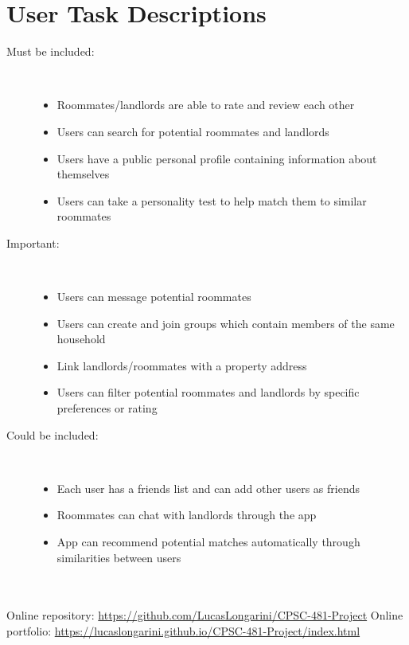 \documentclass{article}
\begin{document}
\section{User Task Descriptions}
\begin{description}
    \item[Must be included:]
        \newline \,
        \begin{itemize}
            \item Roommates/landlords are able to rate and review each other
            \item Users can search for potential roommates and landlords
            \item Users have a public personal profile containing information about themselves
            \item Users can take a personality test to help match them to similar roommates
        \end{itemize}
    \item[Important:]
        \newline \,
        \begin{itemize}
            \item Users can message potential roommates
            \item Users can create and join groups which contain members of the same household
            \item Link landlords/roommates with a property address
            \item Users can filter potential roommates and landlords by specific preferences or rating
        \end{itemize}
    \item[Could be included:]
        \newline \,
        \begin{itemize}
            \item Each user has a friends list and can add other users as friends
            \item Roommates can chat with landlords through the app
            \item App can recommend potential matches automatically through similarities between users
        \end{itemize}
\end{description}

\\~\\
Online repository: \url{https://github.com/LucasLongarini/CPSC-481-Project}
\newline
Online portfolio: \url{https://lucaslongarini.github.io/CPSC-481-Project/index.html}
\end{document}
